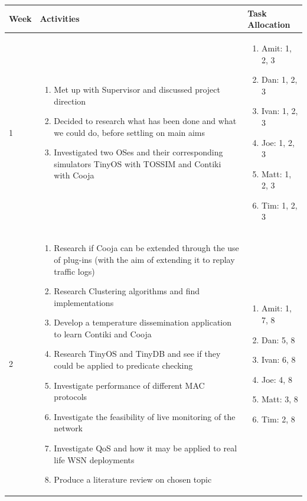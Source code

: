 \documentclass[a4paper]{article}
\begin{document}
\begin{table}[H]
	\centering
	\begin{tabular}{| l | p{7.5cm} | p{5cm} |}
	Week & Activities & Task Allocation\\
	\hline
	1 & \begin{enumerate}
			\item Met up with Supervisor and discussed project direction
			\item Decided to research what has been done and what we could do, before settling on main aims
			\item Investigated two OSes and their corresponding simulators TinyOS with TOSSIM and Contiki with Cooja
		\end{enumerate} &
	\begin{enumerate}
		\item[] Amit: 1, 2, 3
		\item[] Dan: 1, 2, 3
		\item[] Ivan: 1, 2, 3
		\item[] Joe: 1, 2, 3
		\item[] Matt: 1, 2, 3
		\item[] Tim: 1, 2, 3
	\end{enumerate}
	\\ \hline

	2 & \begin{enumerate}
			\item Research if Cooja can be extended through the use of plug-ins (with the aim of extending it to replay traffic logs)
			\item Research Clustering algorithms and find implementations
			\item Develop a temperature dissemination application to learn Contiki and Cooja
			\item Research TinyOS and TinyDB and see if they could be applied to predicate checking
			\item Investigate performance of different MAC protocols
			\item Investigate the feasibility of live monitoring of the network
			\item Investigate QoS and how it may be applied to real life WSN deployments
			\item Produce a literature review on chosen topic
		\end{enumerate} &
	\begin{enumerate}
		\item[] Amit: 1, 7, 8
		\item[] Dan: 5, 8
		\item[] Ivan: 6, 8
		\item[] Joe: 4, 8
		\item[] Matt: 3, 8
		\item[] Tim: 2, 8
	\end{enumerate}
	\\ \hline

	\end{tabular}
\end{table}
\end{document}
